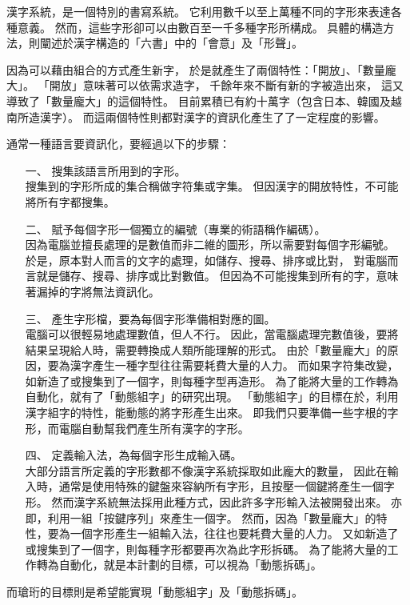 ﻿
漢字系統，是一個特別的書寫系統。%
它利用數千以至上萬種不同的字形來表達各種意義。%
然而，這些字形卻可以由數百至一千多種字形所構成。
具體的構造方法，則闡述於漢字構造的「六書」中的「會意」及「形聲」。

因為可以藉由組合的方式產生新字，%
於是就產生了兩個特性：「開放」、「數量龐大」。%
「開放」意味著可以依需求造字，%
千餘年來不斷有新的字被造出來，%
這又導致了「數量龐大」的這個特性。%
目前累積已有約十萬字（包含日本、韓國及越南所造漢字）。%
而這兩個特性則都對漢字的資訊化產生了了一定程度的影響。

通常一種語言要資訊化，要經過以下的步驟：
\begin{enumerate}
\item[一、]搜集該語言所用到的字形。\\
搜集到的字形所成的集合稱做字符集或字集。%
但因漢字的開放特性，不可能將所有字都搜集。

\item[二、]賦予每個字形一個獨立的編號（專業的術語稱作編碼）。\\
因為電腦並擅長處理的是數值而非二維的圖形，所以需要對每個字形編號。%
於是，原本對人而言的文字的處理，如儲存、搜尋、排序或比對，%
對電腦而言就是儲存、搜尋、排序或比對數值。%
但因為不可能搜集到所有的字，意味著漏掉的字將無法資訊化。

\item[三、]產生字形檔，要為每個字形準備相對應的圖。\\
電腦可以很輕易地處理數值，但人不行。%
因此，當電腦處理完數值後，要將結果呈現給人時，需要轉換成人類所能理解的形式。%
由於「數量龐大」的原因，要為漢字產生一種字型往往需要耗費大量的人力。%
而如果字符集改變，如新造了或搜集到了一個字，則每種字型再造形。%
為了能將大量的工作轉為自動化，就有了「動態組字」的研究出現。%
「動態組字」的目標在於，利用漢字組字的特性，能動態的將字形產生出來。%
即我們只要準備一些字根的字形，而電腦自動幫我們產生所有漢字的字形。

\item[四、]定義輸入法，為每個字形生成輸入碼。\\
大部分語言所定義的字形數都不像漢字系統採取如此龐大的數量，%
因此在輸入時，通常是使用特殊的鍵盤來容納所有字形，且按壓一個鍵將產生一個字形。
然而漢字系統無法採用此種方式，因此許多字形輸入法被開發出來。%
亦即，利用一組「按鍵序列」來產生一個字。%
然而，因為「數量龐大」的特性，要為一個字形產生一組輸入法，往往也要耗費大量的人力。%
又如新造了或搜集到了一個字，則每種字形都要再次為此字形拆碼。%
為了能將大量的工作轉為自動化，就是本計劃的目標，可以視為「動態拆碼」。

\end{enumerate}

而瑲珩的目標則是希望能實現「動態組字」及「動態拆碼」。

